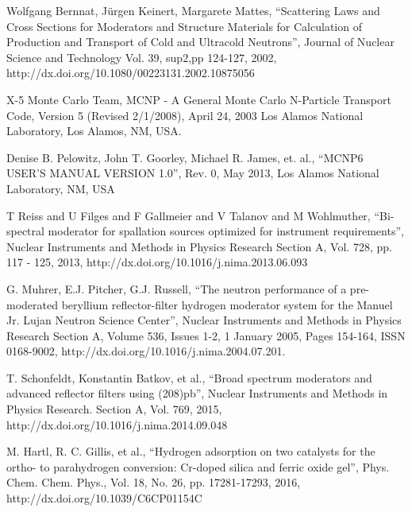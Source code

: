 \documentclass[a4paper]{jpconf}
\begin{document}
\begin{thebibliography}{9}
	     Wolfgang Bernnat, J{\"u}rgen Keinert, Margarete Mattes,
	     ``Scattering Laws and Cross Sections for Moderators and Structure Materials for Calculation of Production and Transport of Cold and Ultracold Neutrons'',
	     Journal of Nuclear Science and Technology Vol. 39, sup2,pp 124-127, 2002, http://dx.doi.org/10.1080/00223131.2002.10875056

		X-5 Monte Carlo Team,
		MCNP - A General Monte Carlo N-Particle Transport Code, Version 5 (Revised 2/1/2008), April 24, 2003
		Los Alamos National Laboratory, Los Alamos, NM, USA.

	     Denise B. Pelowitz, John T. Goorley, Michael R. James,  et. al.,
	     ``MCNP6 USER'S MANUAL VERSION 1.0'', Rev. 0, May 2013, Los Alamos National Laboratory, NM, USA

		T Reiss and U Filges and F Gallmeier and V Talanov and M Wohlmuther,
		``Bi-spectral moderator for spallation sources optimized for instrument requirements'',
		Nuclear Instruments and Methods in Physics Research Section A, Vol. 728, pp. 117 - 125, 2013, http://dx.doi.org/10.1016/j.nima.2013.06.093

          
	  G. Muhrer, E.J. Pitcher, G.J. Russell, 
	  ``The neutron performance of a pre-moderated beryllium reflector-filter hydrogen moderator system for the Manuel Jr. Lujan Neutron Science Center'', Nuclear Instruments and Methods in Physics Research Section A, Volume 536, Issues 1-2, 1 January 2005, Pages 154-164, ISSN 0168-9002, http://dx.doi.org/10.1016/j.nima.2004.07.201.

	  T. Schonfeldt, Konstantin Batkov, et al., 
	  ``Broad spectrum moderators and advanced reflector filters using (208)pb'', Nuclear Instruments and Methods in Physics Research. Section A, Vol. 769, 2015, http://dx.doi.org/10.1016/j.nima.2014.09.048
	  
		M. Hartl, R. C. Gillis, et al.,
		``Hydrogen adsorption on two catalysts for the ortho- to parahydrogen conversion: Cr-doped silica and ferric oxide gel'', Phys. Chem. Chem. Phys., Vol. 18, No. 26, pp. 17281-17293, 2016, http://dx.doi.org/10.1039/C6CP01154C


\end{thebibliography}
\end{document}
